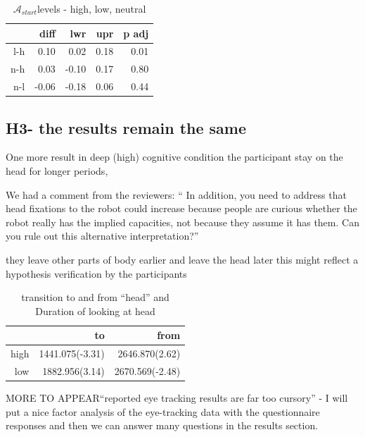 \documentclass[lettersize, noapacite, twoside, HRI]{apa_HRI}
\newcommand{\anti}{{$\mathcal{A}_{start}$\xspace}}
\begin{document}
\begin{table}[ht]
\caption{\anti levels - high, low, neutral}
\centering
\begin{tabular}{rrrrr}
  \hline
 & diff & lwr & upr & p adj \\ 
  \hline
l-h & 0.10 & 0.02 & 0.18 & 0.01 \\ 
  n-h & 0.03 & -0.10 & 0.17 & 0.80 \\ 
  n-l & -0.06 & -0.18 & 0.06 & 0.44 \\ 
   \hline
\end{tabular}
\end{table}


\subsection{H3- the results remain the same}

One more result in deep (high) cognitive condition the participant stay on the head for longer periods, 

We had a comment from the reviewers: `` In addition, you need to address that
head fixations to the robot could increase because people are curious whether
the robot really has the implied capacities, not because they assume it has
them. Can you rule out this alternative interpretation?'' 

they leave other parts of body earlier and leave the head later this might reflect a hypothesis verification by the participants

\begin{table}[ht]
\caption{transition to and from ``head'' and Duration of looking at head}
\centering
\begin{tabular}{rrr}
  \hline
 & to & from \\ 
  \hline
high & 1441.075(-3.31) & 2646.870(2.62) \\ 
  low & 1882.956(3.14) & 2670.569(-2.48) \\ 
   \hline
\end{tabular}
\end{table}




MORE TO APPEAR``reported eye tracking results are far too cursory'' - I will put
a nice factor analysis of the eye-tracking data with the questionnaire responses
and then we can answer many questions in the results section. 




\pagebreak
\appendix
\end{document}
